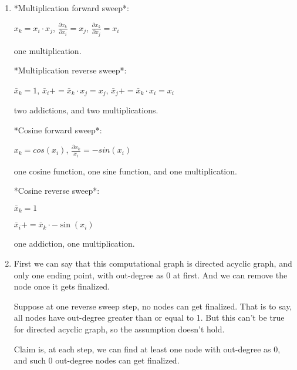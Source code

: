 \documentclass[12pt]{article}
\begin{document}
\begin{enumerate}
\item

*Multiplication forward sweep*:

$x_k = x_i \cdot x_j$, $\frac{\partial x_k}{\partial x_i} = x_j$, $\frac{\partial x_k}{\partial x_j} = x_i$

one multiplication.

*Multiplication reverse sweep*:

$\bar x_k = 1$, $\bar x_i += \bar x_k \cdot x_j = x_j$, $\bar x_j += \bar x_k \cdot x_i = x_i$

two addictions, and two multiplications.

\bigskip

*Cosine forward sweep*:

$x_k = cos (x_i)$, $\frac{\partial x_k}{x_i} = -sin (x_i)$

one cosine function, one sine function, and one multiplication.

*Cosine reverse sweep*:

$\bar x_k = 1$

$\bar x_i += \bar x_k \cdot - \sin(x_i)$

one addiction, one multiplication.





\bigskip
\bigskip
\bigskip





\item

First we can say that this computational graph is directed acyclic graph, and only one ending point, with out-degree as 0 at first. And we can remove the node once it gets finalized.

Suppose at one reverse sweep step, no nodes can get finalized. That is to say, all nodes have out-degree greater than or equal to 1. But this can't be true for directed acyclic graph, so the assumption doesn't hold.

Claim is, at each step, we can find at least one node with out-degree as 0, and such 0 out-degree nodes can get finalized.

\end{enumerate}
\end{document}
